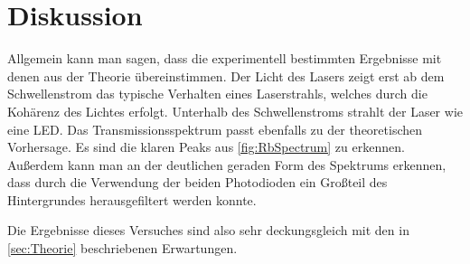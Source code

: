 \section{Diskussion}
\label{sec:Diskussion}

Allgemein kann man sagen, dass die experimentell bestimmten Ergebnisse mit denen aus der Theorie übereinstimmen.
Der Licht des Lasers zeigt erst ab dem Schwellenstrom das typische Verhalten eines Laserstrahls, welches durch die Kohärenz des Lichtes erfolgt. Unterhalb des Schwellenstroms strahlt der Laser wie eine LED.
Das Transmissionsspektrum passt ebenfalls zu der theoretischen Vorhersage. Es sind die klaren Peaks aus \autoref{fig:RbSpectrum} zu erkennen.
Außerdem kann man an der deutlichen geraden Form des Spektrums erkennen, dass durch die Verwendung der beiden Photodioden ein Großteil des Hintergrundes herausgefiltert werden konnte.

Die Ergebnisse dieses Versuches sind also sehr deckungsgleich mit den in \autoref{sec:Theorie} beschriebenen Erwartungen.